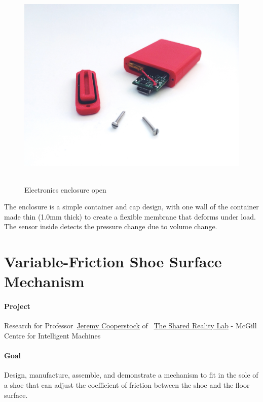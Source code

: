 \documentclass[12pt, landscape]{article}
\begin{document}
	\begin{figure}[H]
		\centering
		\includegraphics[height=4in]{media/enclosure_open}
		\caption{Electronics enclosure open}
		\label{enclosure_open}
	\end{figure}

	The enclosure is a simple container and cap design, with one wall of the container made thin (1.0mm thick) to create a flexible membrane that deforms under load. The sensor inside detects the pressure change due to volume change.

	\section{Variable-Friction Shoe Surface Mechanism}
		\paragraph{Project} Research for Professor~\href{http://www.cim.mcgill.ca/~jer/}{Jeremy Cooperstock} of~ \href{http://www.cim.mcgill.ca/sre}{The Shared Reality Lab} - McGill Centre for Intelligent Machines
		\paragraph{Goal} Design, manufacture, assemble, and demonstrate a mechanism to fit in the sole of a shoe that can adjust the coefficient of friction between the shoe and the floor surface.
\end{document}
